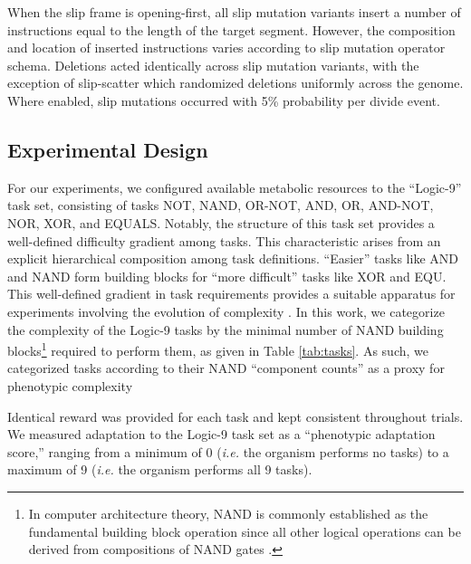 When the slip frame is opening-first, all slip mutation variants insert a number of instructions equal to the length of the target segment.
However, the composition and location of inserted instructions varies according to slip mutation operator schema.
Deletions acted identically across slip mutation variants, with the exception of slip-scatter which randomized deletions uniformly across the genome.
Where enabled, slip mutations occurred with 5\% probability per divide event.

\subsection{Experimental Design}



For our experiments, we configured available metabolic resources to the ``Logic-9'' task set, consisting of tasks NOT, NAND, OR-NOT, AND, OR, AND-NOT, NOR, XOR, and EQUALS.
Notably, the structure of this task set provides a well-defined difficulty gradient among tasks.
This characteristic arises from an explicit hierarchical composition among task definitions.
``Easier'' tasks like AND and NAND form building blocks for ``more difficult'' tasks like XOR and EQU.
This well-defined gradient in task requirements provides a suitable apparatus for experiments involving the evolution of complexity \citep{lenski2003evolutionary}.
In this work, we categorize the complexity of the Logic-9 tasks by the minimal number of NAND building blocks\footnote{
In computer architecture theory, NAND is commonly established as the fundamental building block operation since all other logical operations can be derived from compositions of NAND gates \citep{mano1997logic}.
} required to perform them, as given in Table \ref{tab:tasks}.
As such, we categorized tasks according to their NAND ``component counts'' as a proxy for phenotypic complexity

Identical reward was provided for each task and kept consistent throughout trials.
We measured adaptation to the Logic-9 task set as a ``phenotypic adaptation score,'' ranging from a minimum of 0 (\textit{i.e.} the organism performs no tasks) to a maximum of 9 (\textit{i.e.} the organism performs all 9 tasks).

